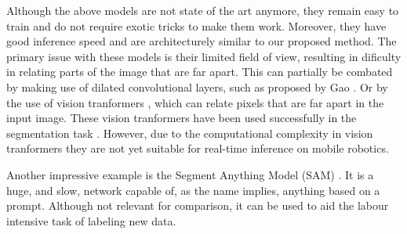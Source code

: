 Although the above models are not state of the art anymore, they remain easy to train and do not require exotic tricks to make them work. Moreover, they have good inference speed and are architecturely similar to our proposed method. The primary issue with these models is their limited field of view, resulting in dificulty in relating parts of the image that are far apart. This can partially be combated by making use of dilated convolutional layers, such as proposed by Gao \cite{gao2023rethinking}. Or by the use of vision tranformers \cite{dosovitskiy2021image}, which can relate pixels that are far apart in the input image. These vision tranformers have been used successfully in the segmentation task \cite{xie2021segformer,chen2022vision}. However, due to the computational complexity in vision tranformers they are not yet suitable for real-time inference on mobile robotics.

Another impressive example is the Segment Anything Model (SAM) \cite{kirillov2023segment}. It is a huge, and slow, network capable of, as the name implies, anything based on a prompt. Although not relevant for comparison, it can be used to aid the labour intensive task of labeling new data.
